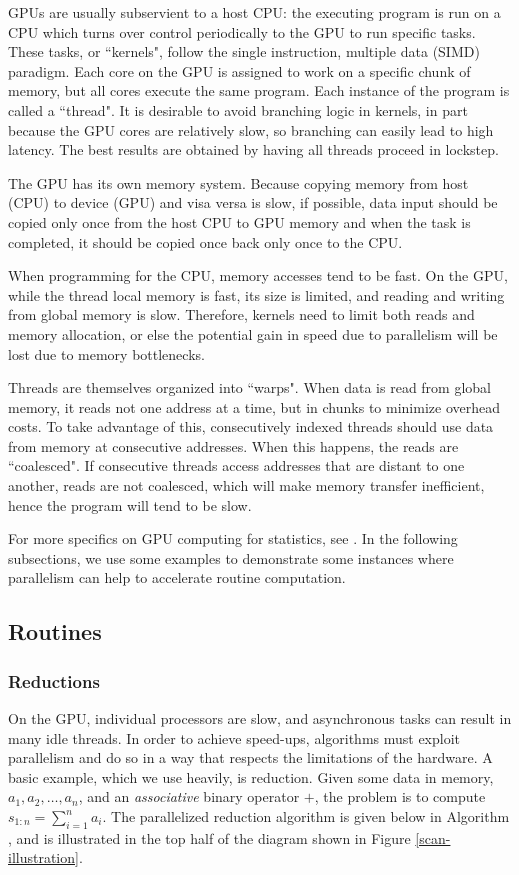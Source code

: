 {GPUs are usually subservient to a host CPU: the executing program is run on a CPU which turns over control periodically to the GPU to run specific tasks. These tasks, or ``kernels", follow the single instruction, multiple data (SIMD) paradigm. Each core on the GPU is assigned to work on a specific chunk of memory, but all cores execute the same program. Each instance of the program is called a ``thread". It is desirable to avoid branching logic in kernels, in part because the GPU cores are relatively slow, so branching can easily lead to high latency. The best results are obtained by having all threads proceed in lockstep.

The GPU has its own memory system. Because copying memory from host (CPU) to device (GPU) and visa versa is slow, if possible, data input should be copied only once from the host CPU to GPU memory and when the task is completed, it should be copied once back only once to the CPU.

When programming for the CPU, memory accesses tend to be fast. On the GPU, while the thread local memory is fast, its size is limited, and reading and writing from global memory is slow. Therefore, kernels need to limit both reads and memory allocation, or else the potential gain in speed due to parallelism will be lost due to memory bottlenecks.

Threads are themselves organized into ``warps". When data is read from global memory, it reads not one address at a time, but in chunks to minimize overhead costs. To take advantage of this, consecutively indexed threads should use data from memory at consecutive addresses. When this happens, the reads are ``coalesced". If consecutive threads access addresses that are distant to one another, reads are not coalesced, which will make memory transfer inefficient, hence the program will tend to be slow.

For more specifics on GPU computing for statistics, see \citet{suchard}. In the following subsections, we use some examples to demonstrate some instances where parallelism can help to accelerate routine computation.

\subsection{Routines}
\label{sec:routines}
\subsubsection{Reductions}
\label{subsec:reduce}
On the GPU, individual processors are slow, and asynchronous tasks can result in many idle threads. In order to achieve speed-ups, algorithms must exploit parallelism and do so in a way that respects the limitations of the hardware. A basic example, which we use heavily, is reduction. Given some data in memory, $a_1, a_2, \ldots, a_n$, and an \textit{associative} binary operator $+$, the problem is to compute $s_{1:n}=\sum_{i=1}^n a_i$. The parallelized reduction algorithm is given below in Algorithm \label{reduce}, and is illustrated in the top half of the diagram shown in Figure \ref{scan-illustration}.  

}

